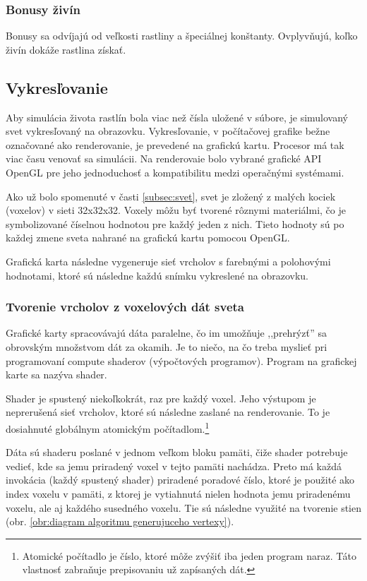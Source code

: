 \documentclass[12pt]{article}
\begin{document}
\subsubsection{Bonusy živín}

Bonusy sa odvíjajú od veľkosti rastliny a špeciálnej konštanty. Ovplyvňujú, koľko
živín dokáže rastlina získať.

\subsection{Vykresľovanie}

Aby simulácia života rastlín bola viac než čísla uložené v súbore, je simulovaný svet
vykresľovaný na obrazovku. Vykresľovanie, v počítačovej grafike bežne označované
ako renderovanie, je prevedené na grafickú kartu.
Procesor má tak viac času venovať sa simulácii. Na renderovaie bolo vybrané
grafické API OpenGL pre jeho jednoduchosť a kompatibilitu medzi operačnými
systémami.

Ako už bolo spomenuté v časti \ref{subsec:svet}, svet je zložený z malých
kociek (voxelov) v sieti 32x32x32. Voxely môžu byť tvorené rôznymi materiálmi,
čo je symbolizované číselnou hodnotou pre každý jeden z nich. Tieto
hodnoty sú po každej zmene sveta nahrané na grafickú kartu pomocou OpenGL.

Grafická karta následne vygeneruje sieť vrcholov s farebnými a
polohovými hodnotami, ktoré sú následne každú snímku vykreslené na obrazovku.

\subsubsection{Tvorenie vrcholov z voxelových dát sveta}

Grafické karty spracovávajú dáta paralelne,
čo im umožňuje ,,prehrýzť'' sa obrovským množstvom dát za okamih.
Je to niečo, na čo treba myslieť pri programovaní compute shaderov
(výpočtových programov). Program na grafickej karte sa nazýva shader.

Shader je spustený niekoľkokrát, raz pre každý voxel. Jeho výstupom je
neprerušená sieť vrcholov, ktoré sú následne zaslané na renderovanie.
To je dosiahnuté globálnym atomickým počítadlom.\footnote
{Atomické počítadlo je číslo, ktoré môže zvýšiť iba jeden program naraz. Táto
	vlastnosť zabraňuje prepisovaniu už zapísaných dát.}

Dáta sú shaderu poslané v jednom veľkom bloku pamäti, čiže shader potrebuje
vedieť, kde sa jemu priradený voxel v tejto pamäti nachádza. Preto má každá
invokácia (každý spustený shader) priradené poradové číslo, ktoré
je použité ako index voxelu v pamäti, z ktorej je vytiahnutá nielen
hodnota jemu priradenému voxelu, ale aj každého susedného voxelu. Tie sú
následne využité na tvorenie stien
(obr. \ref{obr:diagram algoritmu generujuceho vertexy}).
\end{document}
